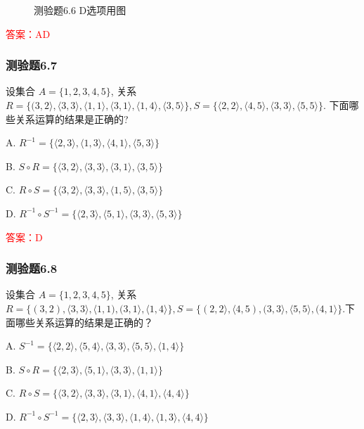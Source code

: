 \documentclass[UTF8, heading=true]{ctexart}
\begin{document}
\begin{figure}[htbp]
\begin{minipage}[t]{0.23\textwidth}
	      \vspace{-0.3cm}
        \caption{测验题6.6 D选项用图}
\end{minipage}
\end{figure}

\textcolor{red}{答案：AD}



\subsubsection{测验题6.7}

设集合 $A=\{1,2,3,4,5\}$, 关系 $R=\{(3,2\rangle,\langle 3,3\rangle,\langle 1,1\rangle,\langle 3,1\rangle,\langle 1,4\rangle,\langle 3,5\rangle\}, S=\{\langle 2,2\rangle,\langle 4,5\rangle,\langle 3,3\rangle,\langle 5,5\rangle\}$.
下面哪些关系运算的结果是正确的?

A. $R^{-1}=\{\langle 2,3\rangle,\langle 1,3\rangle,\langle 4,1\rangle,\langle 5,3\rangle\}$

B. $S \circ R=\{\langle 3,2\rangle,\langle 3,3\rangle,\langle 3,1\rangle,\langle 3,5\rangle\}$

C. $R \circ S=\{\langle 3,2\rangle,\langle 3,3\rangle,\langle 1,5\rangle,\langle 3,5\rangle\}$

D. 
$R^{-1} \circ S^{-1}=\{\langle 2,3\rangle,\langle 5,1\rangle,\langle 3,3\rangle,\langle 5,3\rangle\}$

\textcolor{red}{答案：D}


\subsubsection{测验题6.8}

设集合 $A=\{1,2,3,4,5\}$, 关系 $R=\{(3,2),\langle 3,3\rangle,\langle 1,1),(3,1\rangle,\langle 1,4\rangle\}, S=\{(2,2\rangle,\langle 4,5),(3,3\rangle,\langle 5,5\rangle,(4,1\rangle\}$.下面哪些关系运算的结果是正确的？

A. $S^{-1}=\{\langle 2,2\rangle,\langle 5,4\rangle,\langle 3,3\rangle,\langle 5,5\rangle,\langle 1,4\rangle\}$

B. ${S \circ R}=\{\langle 2,3\rangle,\langle 5,1\rangle,\langle 3,3\rangle,\langle 1,1\rangle\}$

C. ${R \circ S}=\{\langle 3,2\rangle,\langle 3,3\rangle,\langle 3,1\rangle,\langle 4,1\rangle,\langle 4,4\rangle\}$

D. $R^{-1} \circ S^{-1}=\{\langle 2,3\rangle,\langle 3,3\rangle,\langle 1,4\rangle,\langle 1,3\rangle,\langle 4,4\rangle\}$
\end{document}
